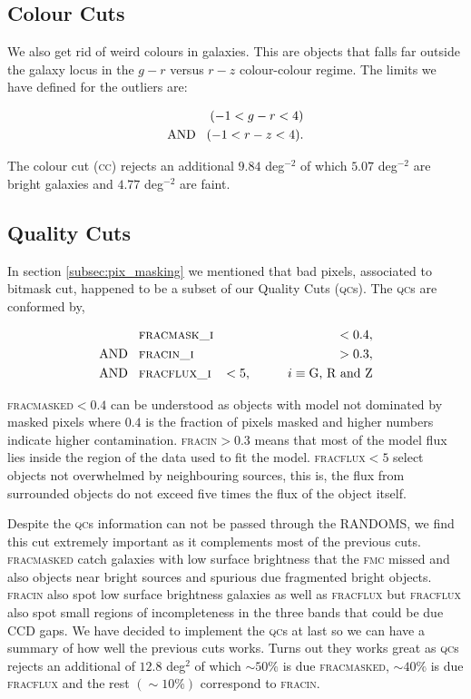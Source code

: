 \documentclass[fleqn,usenatbib]{mnras}
\newcommand{\CC}{\textsc{cc}\xspace}
\newcommand{\FMC}{{\textsc{fmc}}\xspace}
\newcommand{\FRACMASKED}{{\textsc{fracmasked}}\xspace}
\newcommand{\FRACFLUX}{{\textsc{fracflux}}\xspace}
\newcommand{\FRACIN}{{\textsc{fracin}}\xspace}
\newcommand{\QCs}{\textsc{qc}s\xspace}
\begin{document}
\subsection{Colour Cuts}

We also get rid of weird colours in galaxies. This are objects that falls far outside the galaxy locus in the $g-r$ versus $r-z$ colour-colour regime. The limits we have defined for the outliers are:

\begin{eqnarray}
    (-1 < g-r < 4) \nonumber \\
    \text{AND} \hspace{3mm} (-1 < r-z < 4).
\end{eqnarray}

The colour cut (\CC) rejects an additional $9.84$ deg$^{-2}$ of which $5.07$ deg$^{-2}$ are bright galaxies and $4.77$ deg$^{-2}$ are faint.

\subsection{Quality Cuts}

In section \ref{subsec:pix_masking} we mentioned that bad pixels, associated to bitmask cut, happened to be a subset of our Quality Cuts (\QCs). The \QCs are conformed by,

\begin{eqnarray}
    &\textsc{fracmask\_i}& < 0.4, \nonumber \\
    \text{AND} \hspace{3mm} &\textsc{fracin\_i}& > 0.3, \nonumber \\
    \text{AND} \hspace{3mm} &\textsc{fracflux\_i}& < 5, \hspace{1cm} i \equiv  \textrm{G, R and Z}
\end{eqnarray}

\FRACMASKED $< 0.4$ can be understood as objects with model not dominated by masked pixels where $0.4$ is the fraction of pixels masked and higher numbers indicate higher contamination. \FRACIN $> 0.3$ means that most of the model flux lies inside the region of the data used to fit the model. \FRACFLUX $< 5$ select objects not overwhelmed by neighbouring sources, this is, the flux from surrounded objects do not exceed five times the flux of the object itself.

Despite the \QCs information can not be passed through the RANDOMS, we find this cut extremely important as it complements most of the previous cuts. \FRACMASKED catch galaxies with low surface brightness that the \FMC missed and also objects near bright sources and spurious due fragmented bright objects. \FRACIN also spot low surface brightness galaxies as well as \FRACFLUX but \FRACFLUX also spot small regions of incompleteness in the three bands that could be due CCD gaps. We have decided to implement the \QCs at last so we can have a summary of how well the previous cuts works. Turns out they works great as \QCs rejects an additional of $12.8$ deg$^{2}$ of which $\sim 50 \%$ is due \FRACMASKED, $\sim 40 \%$ is due \FRACFLUX and the rest $(\sim 10 \%)$ correspond to \FRACIN.
\end{document}
